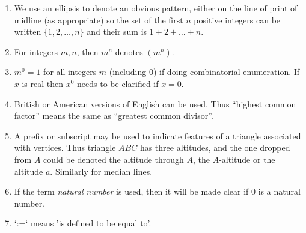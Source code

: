 \documentclass{article}
\begin{document}
\begin{enumerate}
    \item We use an ellipsis to denote an obvious pattern, either on the line of print of midline (as appropriate) so the set of the first $n$ positive integers can be written $\{1, 2, \ldots, n\}$ and their sum is $1 + 2 + \ldots + n$.
    
    \item For integers $m, n$, then $m^n$ denotes $(m^n)$.
    
    \item $m^0 = 1$ for all integers $m$ (including 0) if doing combinatorial enumeration. If $x$ is real then $x^0$ needs to be clarified if $x = 0$.
    
    \item British or American versions of English can be used. Thus ``highest common factor'' means the same as ``greatest common divisor''.
    
    \item A prefix or subscript may be used to indicate features of a triangle associated with vertices. Thus triangle $ABC$ has three altitudes, and the one dropped from $A$ could be denoted the altitude through $A$, the $A$-altitude or the altitude $a$. Similarly for median lines.
    
    \item If the term \textit{natural number} is used, then it will be made clear if 0 is a natural number.
    
    \item `:=` means 'is defined to be equal to'.
\end{enumerate}
\end{document}

